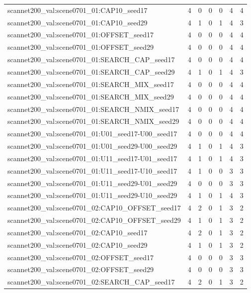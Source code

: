 \begin{table}[t]
\begin{tabular}{lrrrrrr}
scannet200\_val:scene0701\_01:CAP10\_seed17 & 4 & 0 & 0 & 0 & 4 & 4 \\
scannet200\_val:scene0701\_01:CAP10\_seed29 & 4 & 1 & 0 & 1 & 4 & 3 \\
scannet200\_val:scene0701\_01:OFFSET\_seed17 & 4 & 0 & 0 & 0 & 4 & 4 \\
scannet200\_val:scene0701\_01:OFFSET\_seed29 & 4 & 0 & 0 & 0 & 4 & 4 \\
scannet200\_val:scene0701\_01:SEARCH\_CAP\_seed17 & 4 & 0 & 0 & 0 & 4 & 4 \\
scannet200\_val:scene0701\_01:SEARCH\_CAP\_seed29 & 4 & 1 & 0 & 1 & 4 & 3 \\
scannet200\_val:scene0701\_01:SEARCH\_MIX\_seed17 & 4 & 0 & 0 & 0 & 4 & 4 \\
scannet200\_val:scene0701\_01:SEARCH\_MIX\_seed29 & 4 & 0 & 0 & 0 & 4 & 4 \\
scannet200\_val:scene0701\_01:SEARCH\_NMIX\_seed17 & 4 & 0 & 0 & 0 & 4 & 4 \\
scannet200\_val:scene0701\_01:SEARCH\_NMIX\_seed29 & 4 & 0 & 0 & 0 & 4 & 4 \\
scannet200\_val:scene0701\_01:U01\_seed17-U00\_seed17 & 4 & 0 & 0 & 0 & 4 & 4 \\
scannet200\_val:scene0701\_01:U01\_seed29-U00\_seed29 & 4 & 1 & 0 & 1 & 4 & 3 \\
scannet200\_val:scene0701\_01:U11\_seed17-U01\_seed17 & 4 & 1 & 0 & 1 & 4 & 3 \\
scannet200\_val:scene0701\_01:U11\_seed17-U10\_seed17 & 4 & 1 & 0 & 0 & 3 & 3 \\
scannet200\_val:scene0701\_01:U11\_seed29-U01\_seed29 & 4 & 0 & 0 & 0 & 3 & 3 \\
scannet200\_val:scene0701\_01:U11\_seed29-U10\_seed29 & 4 & 1 & 0 & 1 & 4 & 3 \\
scannet200\_val:scene0701\_02:CAP10\_OFFSET\_seed17 & 4 & 2 & 0 & 1 & 3 & 2 \\
scannet200\_val:scene0701\_02:CAP10\_OFFSET\_seed29 & 4 & 1 & 0 & 1 & 3 & 2 \\
scannet200\_val:scene0701\_02:CAP10\_seed17 & 4 & 2 & 0 & 1 & 3 & 2 \\
scannet200\_val:scene0701\_02:CAP10\_seed29 & 4 & 1 & 0 & 1 & 3 & 2 \\
scannet200\_val:scene0701\_02:OFFSET\_seed17 & 4 & 0 & 0 & 0 & 3 & 3 \\
scannet200\_val:scene0701\_02:OFFSET\_seed29 & 4 & 0 & 0 & 0 & 3 & 3 \\
scannet200\_val:scene0701\_02:SEARCH\_CAP\_seed17 & 4 & 2 & 0 & 1 & 3 & 2 \\

\end{tabular}
\end{table}
